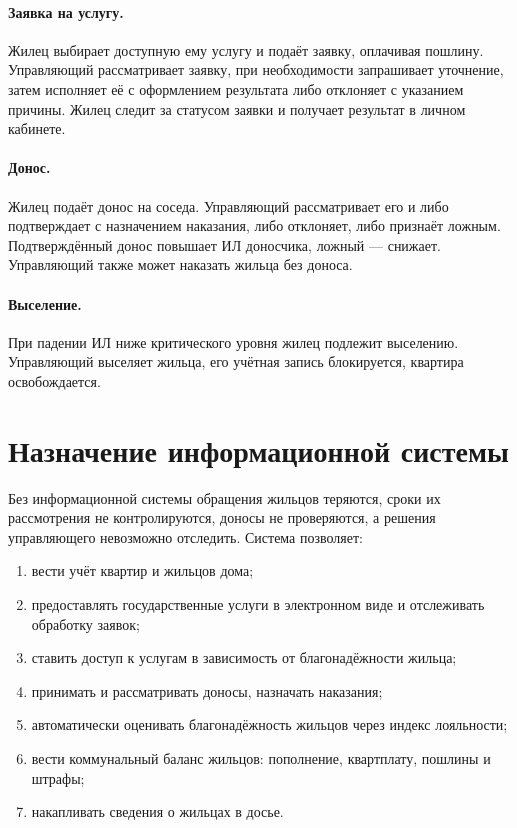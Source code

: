 \documentclass[12pt,a4paper]{article}
\begin{document}
\paragraph{Заявка на услугу.} Жилец выбирает доступную ему услугу и подаёт
заявку, оплачивая пошлину. Управляющий рассматривает заявку, при
необходимости запрашивает уточнение, затем исполняет её с оформлением
результата либо отклоняет с указанием причины. Жилец следит за статусом
заявки и получает результат в личном кабинете.

\paragraph{Донос.} Жилец подаёт донос на соседа. Управляющий рассматривает
его и либо подтверждает с назначением наказания, либо отклоняет, либо
признаёт ложным. Подтверждённый донос повышает ИЛ доносчика, ложный ---
снижает. Управляющий также может наказать жильца без доноса.

\paragraph{Выселение.} При падении ИЛ ниже критического уровня жилец
подлежит выселению. Управляющий выселяет жильца, его учётная запись
блокируется, квартира освобождается.

\section{Назначение информационной системы}

Без информационной системы обращения жильцов теряются, сроки их
рассмотрения не контролируются, доносы не проверяются, а решения
управляющего невозможно отследить. Система позволяет:

\begin{enumerate}
  \item вести учёт квартир и жильцов дома;
  \item предоставлять государственные услуги в электронном виде и
        отслеживать обработку заявок;
  \item ставить доступ к услугам в зависимость от благонадёжности жильца;
  \item принимать и рассматривать доносы, назначать наказания;
  \item автоматически оценивать благонадёжность жильцов через индекс
        лояльности;
  \item вести коммунальный баланс жильцов: пополнение, квартплату, пошлины
        и штрафы;
  \item накапливать сведения о жильцах в досье.
\end{enumerate}
\end{document}
